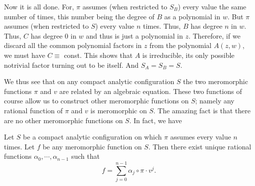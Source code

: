\documentclass[a4paper,11pt]{article}
\begin{document}
\begin{myproof}
  Now it is all done.  For, $\pi$ assumes (when restricted to $S_B$)
  every value the same number of times, this number being the degree
  of $B$ as a polynomial in $w$.  But $\pi$ assumes (when restricted
  to $S$) every value $n$ times.  Thus, $B$ has degree $n$ in $w$.
  Thus, $C$ has degree 0 in $w$ and thus is just a polynomial in $z$.
  Therefore, if we discard all the common polynomial factors in $z$
  from the polynomial $A(z,w)$, we must have $C \equiv$ const.  This
  shows that $A$ is irreducible, its only possible notrivial factor
  turning out to be itself.  And $S_A = S_B = S$.
\end{myproof}

We thus see that on any compact analytic configuration $S$ the two
meromorphic functions $\pi$ and $v$ are related by an algebraic
equation.  These two functions of course allow us to construct other
meromorphic functions on $S$; namely any rational function of $\pi$
and $v$ is meromorphic on $S$.  The amazing fact is that there are no
other meromorphic functions on $S$.  In fact, we have

\begin{thm}
  \label{thm:4}
  Let $S$ be a compact analytic configuration on which $\pi$ assumes
  every value $n$ times.  Let $f$ be any meromorphic function on $S$.
  Then there exist unique rational functions $\alpha_0, \cdots,
  \alpha_{n-1}$ such that
  $$
  f = \sum_{j=0}^{n-1} \alpha_j \circ \pi \cdot v^j.
  $$
\end{thm}
\end{document}
